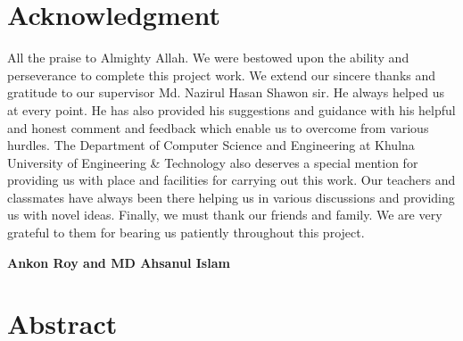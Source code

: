\documentclass[12pt,a4paper]{report}
\begin{document}
\clearpage

\chapter*{Acknowledgment}

All the praise to Almighty Allah. We were bestowed upon the ability and perseverance to complete this project work.
We extend our sincere thanks and gratitude to our supervisor Md. Nazirul Hasan Shawon sir. He always helped us at every point. He has also provided his suggestions and guidance with his helpful and honest comment and feedback which enable us to overcome from various hurdles.
The Department of Computer Science and Engineering at Khulna University of Engineering \& Technology also deserves a special mention for providing us with place and facilities for carrying out this work. Our teachers and classmates have always been there helping us in various discussions and providing us with novel ideas.
Finally, we must thank our friends and family. We are very grateful to them for bearing us patiently throughout this project.

\vspace{24pt}
\begin{flushright}
\textbf{Ankon Roy and MD Ahsanul Islam}
\end{flushright}
\clearpage

\chapter*{Abstract}
\end{document}
